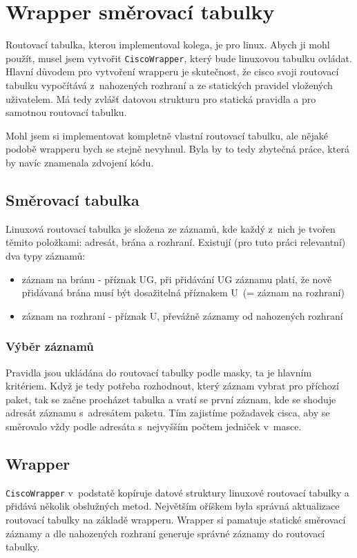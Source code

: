 \section{Wrapper směrovací tabulky}
Routovací tabulka, kterou implementoval kolega, je  pro linux. Abych ji mohl použít, musel jsem vytvořit \verb|CiscoWrapper|, který bude linuxovou tabulku ovládat. Hlavní důvodem pro vytvoření wrapperu je skutečnost, že cisco svoji routovací tabulku vypočítává z~nahozených rozhraní a ze statických pravidel vložených uživatelem. Má tedy zvlášť datovou strukturu pro statická pravidla a pro samotnou routovací tabulku.

Mohl jsem si implementovat kompletně vlastní routovací tabulku, ale nějaké podobě wrapperu bych se stejně nevyhnul. Byla by to tedy zbytečná práce, která by navíc znamenala zdvojení kódu.


\subsection{Směrovací tabulka}
Linuxová routovací tabulka je složena ze záznamů, kde každý z~nich je tvořen těmito položkami: adresát, brána a rozhraní. Existují (pro tuto práci relevantní) dva typy záznamů:
\begin{itemize}
 \item záznam na bránu - příznak UG, při přidávání UG záznamu platí, že nově přidávaná brána musí být dosažitelná příznakem U~(= záznam na rozhraní)
 \item záznam na rozhraní - příznak U, převážně záznamy od nahozených rozhraní
\end{itemize}


\subsubsection{Výběr záznamů}
Pravidla jsou ukládána do routovací tabulky podle masky, ta je hlavním kritériem. Když je tedy potřeba rozhodnout, který záznam vybrat pro příchozí paket, tak se začne procházet tabulka a vratí se první záznam, kde se shoduje adresát záznamu s~adresátem paketu. Tím zajistíme požadavek cisca, aby se směrovalo vždy podle adresáta s~nejvyšším počtem jedniček v~masce.

\subsection{Wrapper}
\verb|CiscoWrapper| v~podstatě kopíruje datové struktury linuxové routovací tabulky a přidává několik obslužných metod. Největším oříškem byla správná aktualizace routovací tabulky na základě wrapperu. Wrapper si pamatuje statické směrovací záznamy a dle nahozených rozhraní generuje správné záznamy do routovací tabulky. 


